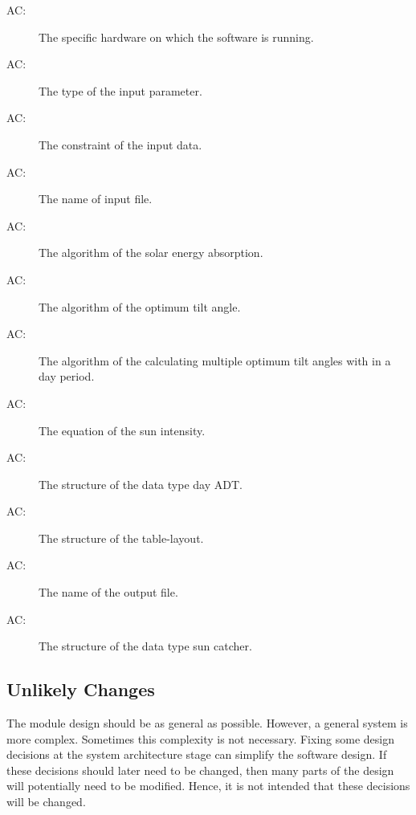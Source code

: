 \documentclass[12pt, titlepage]{article}
\newcounter{acnum}
\newcommand{\actheacnum}{AC\theacnum}
\begin{document}
\begin{description}
\item[ \actheacnum \label{acH}:] The specific
  hardware on which the software is running.
\item[ \actheacnum \label{acIP}:] The type of the
  input parameter. 
\item[ \actheacnum \label{acIC}:] The constraint of the input data.
\item[ \actheacnum \label{acR}:] The name of input file.
\item[ \actheacnum \label{acSEA}:] The algorithm of the
 solar energy absorption.
\item[ \actheacnum \label{acOTP}:] The algorithm of the 
optimum tilt angle.
\item[ \actheacnum \label{acOTPdiffDay}:] The algorithm of the calculating multiple optimum tilt angles with in a day period.
\item[ \actheacnum \label{acSI}:] The equation of the sun
intensity.
\item[ \actheacnum \label{acDD}:] The structure of the 
data type day ADT.
\item[ \actheacnum \label{acT}:] The structure of 
the table-layout.
\item[ \actheacnum \label{acTFile}:] The name of 
the output file.
\item[ \actheacnum \label{acSCT}:]  The structure of the data type sun catcher.
\end{description}

\subsection{Unlikely Changes} \label{SecUchange}

The module design should be as general as possible. However, a general system
is more complex. Sometimes this complexity is not necessary. Fixing some design
decisions at the system architecture stage can simplify the software design. If
these decisions should later need to be changed, then many parts of the design
will potentially need to be modified. Hence, it is not intended that these
decisions will be changed.
\end{document}
